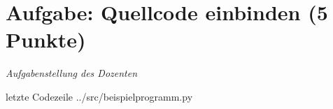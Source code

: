 
\newcommand{\dozent}{Prof. Dr. Claudia Müller-Birn, Barry Linnert}					%
\newcommand{\tutor}{Thierry Meurers}						%
\newcommand{\tutoriumNo}{10}				%
\newcommand{\ubungNo}{01}									%
\newcommand{\veranstaltung}{Objektorientierte Programmierung}	%
\newcommand{\semester}{SoSe 17}						%
\newcommand{\studenten}{Stefaan Hessmann, Jaap Pedersen, Mark Niehues}			%




\section{Aufgabe: Quellcode einbinden \hfill (5 Punkte)}
{\itshape Aufgabenstellung des Dozenten}

 letzte Codezeile
{../src/beispielprogramm.py}

